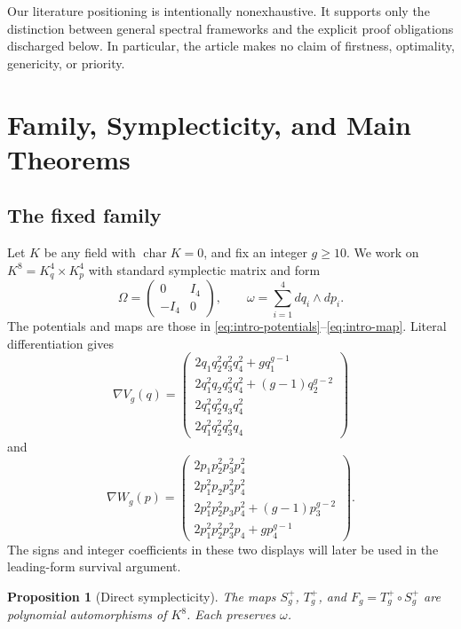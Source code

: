 \documentclass[11pt]{article}
\newtheorem{proposition}[theorem]{Proposition}
\theoremstyle{remark}
\numberwithin{equation}{section}
\begin{document}
Our literature positioning is intentionally nonexhaustive.  It supports
only the distinction between general spectral frameworks and the explicit
proof obligations discharged below.  In particular, the article makes no
claim of firstness, optimality, genericity, or priority.

\section{Family, Symplecticity, and Main Theorems}\label{sec:family}

\subsection{The fixed family}

Let \(K\) be any field with \(\operatorname{char}K=0\), and fix an integer
\(g\geq10\).  We work on \(K^8=K_q^4\times K_p^4\) with standard symplectic
matrix and form
\begin{equation}\label{eq:omega}
\Omega=
\begin{pmatrix}
0&I_4\\
-I_4&0
\end{pmatrix},
\qquad
\omega=\sum_{i=1}^4dq_i\wedge dp_i.
\end{equation}
The potentials and maps are those in
\eqref{eq:intro-potentials}--\eqref{eq:intro-map}.  Literal differentiation
gives
\begin{equation}\label{eq:grad-v}
\nabla V_g(q)=
\begin{pmatrix}
2q_1q_2^2q_3^2q_4^2+gq_1^{g-1}\\
2q_1^2q_2q_3^2q_4^2+(g-1)q_2^{g-2}\\
2q_1^2q_2^2q_3q_4^2\\
2q_1^2q_2^2q_3^2q_4
\end{pmatrix}
\end{equation}
and
\begin{equation}\label{eq:grad-w}
\nabla W_g(p)=
\begin{pmatrix}
2p_1p_2^2p_3^2p_4^2\\
2p_1^2p_2p_3^2p_4^2\\
2p_1^2p_2^2p_3p_4^2+(g-1)p_3^{g-2}\\
2p_1^2p_2^2p_3^2p_4+gp_4^{g-1}
\end{pmatrix}.
\end{equation}
The signs and integer coefficients in these two displays will later be used
in the leading-form survival argument.

\begin{proposition}[Direct symplecticity]\label{prop:symplectic}
The maps \(S_g^+\), \(T_g^+\), and \(F_g=T_g^+\circ S_g^+\) are polynomial
automorphisms of \(K^8\).  Each preserves \(\omega\).
\end{proposition}
\end{document}
